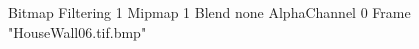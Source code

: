 {Bitmap
	{Filtering 1}
	{Mipmap 1}
	{Blend none}
	{AlphaChannel 0}
	{Frame "HouseWall06.tif.bmp"}
}
